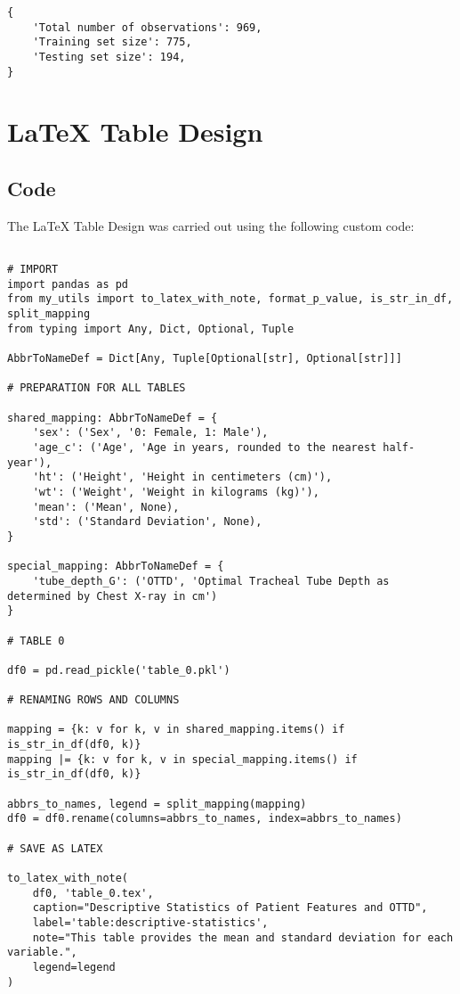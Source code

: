 \documentclass[11pt]{article}
\begin{document}
\begin{Verbatim}[tabsize=4]
{
    'Total number of observations': 969,
    'Training set size': 775,
    'Testing set size': 194,
}
\end{Verbatim}

\section{LaTeX Table Design}
\subsection{{Code}}
The LaTeX Table Design was carried out using the following custom code:

\begin{verbatim}

# IMPORT
import pandas as pd
from my_utils import to_latex_with_note, format_p_value, is_str_in_df, split_mapping
from typing import Any, Dict, Optional, Tuple

AbbrToNameDef = Dict[Any, Tuple[Optional[str], Optional[str]]]

# PREPARATION FOR ALL TABLES

shared_mapping: AbbrToNameDef = {
    'sex': ('Sex', '0: Female, 1: Male'),
    'age_c': ('Age', 'Age in years, rounded to the nearest half-year'),
    'ht': ('Height', 'Height in centimeters (cm)'),
    'wt': ('Weight', 'Weight in kilograms (kg)'),
    'mean': ('Mean', None),
    'std': ('Standard Deviation', None),
}

special_mapping: AbbrToNameDef = {
    'tube_depth_G': ('OTTD', 'Optimal Tracheal Tube Depth as determined by Chest X-ray in cm')
}

# TABLE 0

df0 = pd.read_pickle('table_0.pkl')

# RENAMING ROWS AND COLUMNS

mapping = {k: v for k, v in shared_mapping.items() if is_str_in_df(df0, k)}
mapping |= {k: v for k, v in special_mapping.items() if is_str_in_df(df0, k)}

abbrs_to_names, legend = split_mapping(mapping)
df0 = df0.rename(columns=abbrs_to_names, index=abbrs_to_names)

# SAVE AS LATEX

to_latex_with_note(
    df0, 'table_0.tex',
    caption="Descriptive Statistics of Patient Features and OTTD",
    label='table:descriptive-statistics',
    note="This table provides the mean and standard deviation for each variable.",
    legend=legend
)



\end{verbatim}
\end{document}
